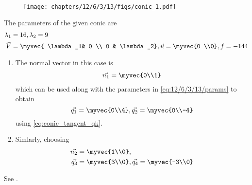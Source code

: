 	\begin{figure}[H]
		\centering
 \texttt{[image: chapters/12/6/3/13/figs/conic\_1.pdf]}
		\caption{}
		\label{fig:12/6/3/13}
  	\end{figure}
The parameters of the given conic are
\begin{align}
	\lambda_1&=16,\lambda_2=9 \\ \vec{V} &= \myvec{	\lambda_1& 0 \\
			          0 & \lambda_2}  
		    , \vec{u} = \myvec{0 \\0}, f = -144
		\label{eq:12/6/3/13/params}
	\end{align}
\begin{enumerate}
	\item The 
normal vector  in this case is
\begin{align}
		\vec{n_1}=\myvec{0\\1}
\end{align}
which can be used along with the parameters in 
		\eqref{eq:12/6/3/13/params}
		to obtain 
\begin{equation}
\vec{q_1}=\myvec{0\\4},
\vec{q_2}=\myvec{0\\-4}
\end{equation}
using 
\eqref{eq:conic_tangent_qk}.
\item Simlarly, 
	choosing
\begin{align}
	\vec{n_2}&=\myvec{1\\0},
	\\
	\vec{q_3}&=\myvec{3\\0},
	\vec{q_4}=\myvec{-3\\0}
\end{align}
\end{enumerate}
		See .
